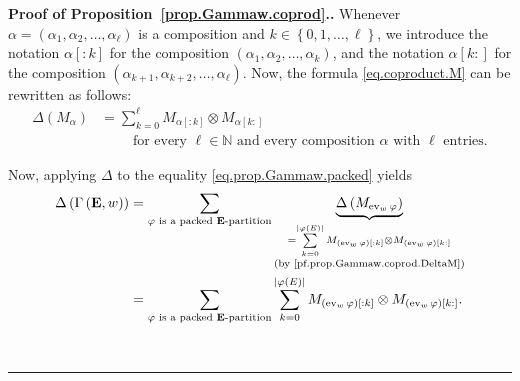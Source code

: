 \documentclass[numbers=enddot,12pt,final,onecolumn,notitlepage,abstracton]{scrartcl}%
\theoremstyle{definition}
\newenvironment{proof}[1][Proof]{\noindent\textbf{#1.} }{\ \rule{0.5em}{0.5em}}
\let\sumnonlimits\sum
\renewcommand{\sum}{\sumnonlimits\limits}
\newcommand{\ev}{\operatorname{ev}}
\newcommand{\EE}{{\mathbf{E}}}
\newcommand{\NN}{{\mathbb{N}}}
\begin{document}
\begin{proof}[Proof of Proposition~\ref{prop.Gammaw.coprod}.]
Whenever
$\alpha = \left(\alpha_1, \alpha_2, \ldots, \alpha_\ell\right)$
is a composition and $k \in \left\{0, 1, \ldots, \ell\right\}$,
we introduce the notation
$\alpha\left[:k\right]$ for the composition
$\left(\alpha_1, \alpha_2, \ldots, \alpha_k\right)$, and the
notation $\alpha\left[k:\right]$ for the composition
$\left(\alpha_{k+1}, \alpha_{k+2}, \ldots, \alpha_\ell\right)$.
Now, the formula \eqref{eq.coproduct.M} can be rewritten as
follows:
\begin{align}
\label{pf.prop.Gammaw.coprod.DeltaM}
\Delta \left( M_\alpha \right)
&= \sum_{k=0}^{\ell} M_{\alpha\left[:k\right]}
\otimes M_{\alpha\left[k:\right]} \\
& \qquad \text{ for every } \ell \in \NN \text{ and every composition } \alpha
\text{ with } \ell \text{ entries.} \nonumber
\end{align}

Now, applying $\Delta$ to the equality
\eqref{eq.prop.Gammaw.packed} yields
\begin{align}
\Delta\left(\Gamma\left(\EE , w\right)\right)
&= \sum_{\varphi \text{ is a packed } \EE\text{-partition}}
\underbrace{\Delta\left(M_{\ev_w \varphi}\right)}_{
  \substack{ = \sum_{k=0}^{\left|\varphi\left(E\right)\right|}
  M_{\left(\ev_w \varphi\right)\left[:k\right]} \otimes
  M_{\left(\ev_w \varphi\right)\left[k:\right]} \\
  \text{(by \eqref{pf.prop.Gammaw.coprod.DeltaM})} }}
 \nonumber \\
&= \sum_{\varphi \text{ is a packed } \EE\text{-partition}}
\sum_{k=0}^{\left|\varphi\left(E\right)\right|}
M_{\left(\ev_w \varphi\right)\left[:k\right]} \otimes
M_{\left(\ev_w \varphi\right)\left[k:\right]} .
\label{pf.Gammaw.coprod.lhs}
\end{align}


\end{proof}
\end{document}
